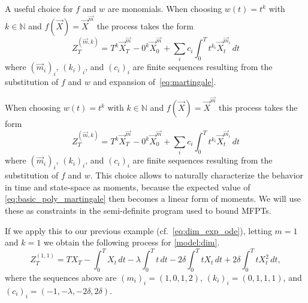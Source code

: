 A useful choice for $f$ and $w$ are monomials.
When choosing $w(t)=t^k$ with $k\in\mathbb N$ and $f(\vec X)={\vec X}^{\vec m}$
the process takes the form
\begin{equation}\label{eq:basic_poly_martingale_app}
Z_T^{(\vec m, k)}=
         T^k \vec X_T^{\vec m}
        - 0^k \vec X_{0}^{\vec m}
        + \sum_{i}c_i\int_0^T t^{k_i} \vec X_t^{\vec m_i}\,dt
\end{equation}
where   $(\vec m_i)_i$, $(k_i)_i$, and $(c_i)_i$ are finite sequences resulting
from the substitution
of $f$ and $w$
and expansion of~\eqref{eq:martingale}.


When choosing $w(t)=t^k$ with $k\in\mathbb N$ and $f(\vec X)={\vec X}^{\vec m}$
this process takes the form
\begin{equation}\label{eq:basic_poly_martingale}
Z_T^{(\vec m, k)}=
         T^k \vec X_T^{\vec m}
        - 0^k \vec X_{0}^{\vec m}
        + \sum_{i}c_i\int_0^T t^{k_i} \vec X_t^{\vec m_i}\,dt
\end{equation}
where   $(\vec m_i)_i$, $(k_i)_i$, and $(c_i)_i$ are finite sequences resulting
from the substitution
of $f$ and $w$.
 This choice allows to naturally
characterize the behavior in time and state-space as moments, because
the expected value of \eqref{eq:basic_poly_martingale} then becomes a linear form
of moments.
We will use these as constraints in the semi-definite program used to bound \acp{MFPT}.

If we apply this to our previous example (cf.\ \eqref{eq:dim_exp_ode}), letting $m=1$ %
and $k=1$ we obtain the following process for \autoref{model:dim}.
$$
    Z_T^{(1,1)} = TX_T - \int_0^T X_t\,dt - \lambda \int_0^T t\,dt - 2\delta
    \int_0^T t X_t\,dt +
    2{\delta}\int_0^TtX_t^2\,dt,
    $$
where the sequences above are $(m_i)_i=(1,0,1,2)$, $(k_i)_i=(0,1,1,1)$,
and $(c_i)_i=(-1,-\lambda, -2\delta,2\delta)$.
